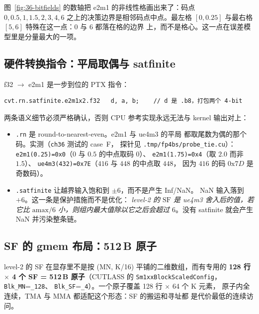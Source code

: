 图~\ref{fig:36-bitfields} 的数轴把 e2m1 的非线性格画出来了：码点
$0,0.5,1,1.5,2,3,4,6$ 之上的决策边界是相邻码点中点。最左格
$[0,0.25]$ 与最右格 $[5,6]$ 特殊在这一点：$0$ 与 $6$ 都落在格的边界
上，而不是格心。这一点在误差模型里是分量最大的一项。

\subsection{硬件转换指令：平局取偶与 satfinite}

f32 $\to$ e2m1 是一步到位的 PTX 指令：

\begin{verbatim}
cvt.rn.satfinite.e2m1x2.f32   d, a, b;    // d 是 .b8，打包两个 4-bit
\end{verbatim}

两条语义细节必须严格确认，否则 CPU 参考实现永远无法与 kernel 输出对上：

\begin{itemize}[itemsep=2pt,topsep=3pt]
  \item \texttt{.rn} 是 round-to-nearest-even。e2m1 与 ue4m3 的平局
        都取尾数为偶的那个码。实测（\texttt{ch36} 测试的 case~F，
        探针见 \texttt{.tmp/fp4bs/probe\_tie.cu}）：
        \texttt{e2m1(0.25)=0x0}（$0$ 与 $0.5$ 的中点取码 0）、
        \texttt{e2m1(1.75)=0x4}（取 $2.0$ 而非 $1.5$）、
        \texttt{ue4m3(432)=0x7E}（$416$ 与 $448$ 的中点取 $448$，
        因为 $416$ 的码 $0\text{x}7D$ 是奇数码）。
  \item \texttt{.satfinite} 让越界输入饱和到 $\pm6$，而不是产生 Inf/NaN。
        NaN 输入落到 $+6$。这一条是保护措施而不是优化：
        \emph{level-2 的 $\mathrm{SF}$ 是 ue4m3 舍入后的值，若它比
        $\mathrm{amax}/6$ 小，则组内最大值除以它之后会超过 $6$}。没有
        satfinite 就会产生 NaN 并污染整条链。
\end{itemize}

\subsection{SF 的 gmem 布局：512\,B 原子}

level-2 的 SF 在显存里不是按 (MN, K/16) 平铺的二维数组，而有专用的
\textbf{128 行 $\times$ 4 个 SF = 512\,B 原子}（CUTLASS 的
\texttt{Sm1xxBlockScaledConfig}，\texttt{Blk\_MN}=\texttt{\_128}、
\texttt{Blk\_SF}=\texttt{\_4}）。一个原子覆盖 128 行 $\times$ 64 个 K 元素，
原子内全连续，TMA 与 MMA 都适配这个形态：SF 的搬运和寻址都
是代价最低的连续访问。

